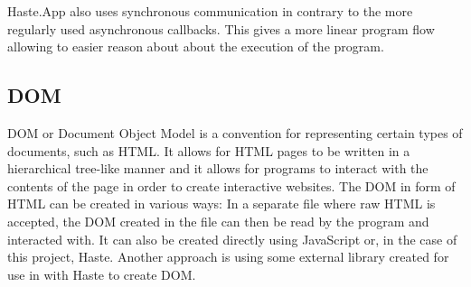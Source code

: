 \documentclass[a4paper]{article}
\begin{document}
Haste.App also uses synchronous communication in contrary to the more regularly used asynchronous callbacks.
This gives a more linear program flow allowing to easier reason about about the execution of the program. 

\subsection{DOM}
DOM or Document Object Model is a convention for representing certain types of documents, such as HTML. It allows for HTML pages to be written in a hierarchical tree-like manner and it allows for programs to interact with the contents of the page in order to create interactive websites. The DOM in form of HTML can be created in various ways: In a separate file where raw HTML is accepted, the DOM created in the file can then be read by the program and interacted with. It can also be created directly using JavaScript or, in the case of this project, Haste. Another approach is using some external library created for use in with Haste to create DOM. 
\end{document}
